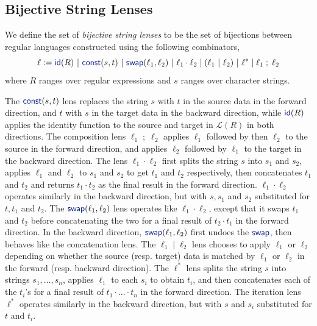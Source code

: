 \documentclass[acmsmall,review,anonymous]{acmart}
\newcommand{\kw}[1]{\textcolor{dkblue}{\ensuremath{\mathsf{#1}}}}
\newcommand{\sep}{\ensuremath{\ | \ }}
\newcommand{\const}{\ensuremath{\kw{const}}}
\newcommand{\swap}{\ensuremath{\kw{swap}}}
\newcommand{\id}{\ensuremath{\kw{id}}}
\begin{document}
\subsection{Bijective String Lenses}
\label{subsec:bijective-lenses}
We define the set of \textit{bijective string lenses} to be the set of
bijections between regular languages constructed using the following
combinators,
$$\ell := \id(R) \sep \const(s, t) \sep  \swap(\ell_1, \ell_2)
\sep \ell_1 \cdot \ell_2 \; |  \; (\ell_1 \sep \ell_2) \sep \ell^* \; | \;
\ell_1 \; ; \;  \ell_2$$
where $R$ ranges over regular expressions and $s$ ranges over character strings.

The $\mathit{\const}(s, t)$ lens replaces the string $s$ with $t$ in the source
data in the forward direction, and $t$ with $s$ in the target data in the
backward direction, while $\kw{id}(R)$ applies the identity function to the
source and target  in $\mathcal{L}(R)$ in both directions. The composition lens
$\ell_1 \; ; \; \ell_2$ applies $\ell_1$ followed by then $\ell_2$ to the
source in the forward direction, and applies $\ell_2$ followed by $\ell_1$ to
the target in the backward direction. The lens $\ell_1 \cdot \ell_2$ first
splits the string $s$ into $s_1$ and $s_2$, applies $\ell_1$ and $\ell_2$ to
$s_1$ and $s_2$ to get $t_1$ and $t_2$ respectively, then concatenates $t_1$
and $t_2$ and returns $t_1 \cdot t_2$ as the final result in the forward
direction. $\ell_1 \cdot \ell_2$ operates similarly in the backward direction,
but with $s, s_1$ and $s_2$ substituted for $t, t_1$ and $t_2$. The
$\swap(\ell_1, \ell_2)$ lens operates like $\ell_1 \cdot \ell_2$,
except that it swaps $t_1$ and $t_2$ before concatenating the two for a final
result of $t_2 \cdot t_1$ in the forward direction. In the backward direction,
$\swap(\ell_1, \ell_2)$ first undoes the \swap, then behaves like
the concatenation lens. The $\ell_1 \; | \; \ell_2$ lens chooses to apply
$\ell_1$ or $\ell_2$ depending on whether the source (resp. target) data is
matched by $\ell_1$ or $\ell_2$ in the forward (resp. backward direction). The
$\ell^*$ lens splits the string $s$ into strings $s_1, \ldots, s_n$, applies
$\ell_1$ to each $s_i$ to obtain $t_i$, and then concatenates each of the $t_i$'s
for a final result of $t_1 \cdot \ldots \cdot t_n$ in the forward direction.
The iteration lens $\ell^*$ operates similarly in the backward direction, but
with $s$ and $s_i$ substituted for $t$ and $t_i$.
\end{document}
